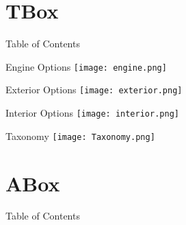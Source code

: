 \documentclass{beamer}
\begin{document}






\section{TBox}
\begin{frame}{Table of Contents}
    \tableofcontents[currentsection]
\end{frame}

\begin{frame}{Engine Options}
\texttt{[image: engine.png]}
\end{frame}

\begin{frame}{Exterior Options}
\texttt{[image: exterior.png]}
\end{frame}

\begin{frame}{Interior Options}
\texttt{[image: interior.png]}
\end{frame}

\begin{frame}{Taxonomy}
\texttt{[image: Taxonomy.png]}
\end{frame}


\section{ABox}
\begin{frame}{Table of Contents}
    \tableofcontents[currentsection]
\end{frame}
\end{document}
